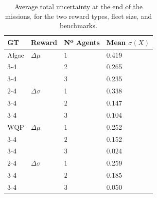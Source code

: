\documentclass[journal]{IEEEtran}
\begin{document}
\begin{table}[th]
\footnotesize
\centering
\begin{tabularx}{0.8\columnwidth}{|X|X|X|X|}
\hline
\textbf{GT} & \textbf{Reward} & \textbf{Nº Agents} & \textbf{Mean $\sigma(X)$} \\ \hline
    Algae & $\Delta \mu $ & 1 & 0.419 \\ \cline{3-4}
    & & 2 & 0.265 \\ \cline{3-4}
    & & 3 & 0.235 \\ \cline{2-4}
    & $\Delta \sigma$ & 1 & 0.338 \\ \cline{3-4}
    & & 2 & 0.147 \\ \cline{3-4}
    & & 3 & 0.104 \\ \hline
    WQP & $\Delta \mu$ & 1 & 0.252 \\ \cline{3-4}
    & & 2 & 0.152 \\ \cline{3-4}
    & & 3 & 0.024 \\ \cline{2-4}
    & $\Delta \sigma$ & 1 & 0.259 \\ \cline{3-4}
    & & 2 & 0.185 \\ \cline{3-4}
    & & 3 & 0.050 \\ \hline
\end{tabularx}
\caption{Average total uncertainty at the end of the missions, for the two reward types, fleet size, and benchmarks.}
\label{tab:uncertainty_final}
\end{table}

\end{document}
